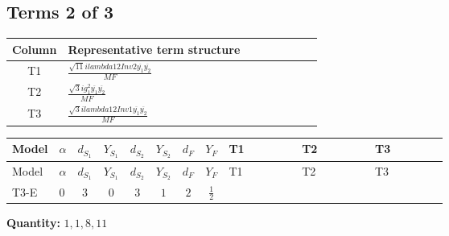\documentclass[8pt]{article}
\begin{document}
\begin{landscape}
\subsection*{Terms 2 of 3}
\begin{center}
\begin{tabular}{@{}c >{\raggedright\arraybackslash}p{0.82\linewidth}@{}}
\toprule
Column & Representative term structure \\
\midrule
T1 & \(\displaystyle \frac{\sqrt{11} i lambda12Inv2 \overline{y_{1}} \overline{y_{2}}}{MF}\) \\
\midrule
T2 & \(\displaystyle \frac{\sqrt{3} i g_{1}^{2} \overline{y_{1}} \overline{y_{2}}}{MF}\) \\
\midrule
T3 & \(\displaystyle \frac{\sqrt{3} i lambda12Inv1 \overline{y_{1}} \overline{y_{2}}}{MF}\) \\
\midrule
\bottomrule
\end{tabular}
\end{center}
\smallskip
\tiny
\begin{longtable}{@{}llcccccc >{\raggedright\arraybackslash}p{0.21\linewidth} >{\raggedright\arraybackslash}p{0.21\linewidth} >{\raggedright\arraybackslash}p{0.21\linewidth}@{}}
\toprule
Model & $\alpha$ & $d_{S_1}$ & $Y_{S_1}$ & $d_{S_2}$ & $Y_{S_2}$ & $d_F$ & $Y_F$ & T1 & T2 & T3 \\
\midrule
\endfirsthead
\toprule
Model & $\alpha$ & $d_{S_1}$ & $Y_{S_1}$ & $d_{S_2}$ & $Y_{S_2}$ & $d_F$ & $Y_F$ & T1 & T2 & T3 \\
\midrule
\endhead
T3-E & $0$ & $3$ & $0$ & $3$ & $1$ & $2$ & $\frac{1}{2}$ & \scriptsize\adjustbox{max width=\linewidth}{$\begin{gathered} - \frac{3 \sqrt{11} i lambda12Inv2 \overline{y_{1}} \overline{y_{2}}}{22 MF}\end{gathered}$} & \scriptsize\adjustbox{max width=\linewidth}{$\begin{gathered} - \frac{\sqrt{3} i g_{1}^{2} \overline{y_{1}} \overline{y_{2}}}{8 MF}\end{gathered}$} & \scriptsize\adjustbox{max width=\linewidth}{$\begin{gathered} \frac{\sqrt{3} i lambda12Inv1 \overline{y_{1}} \overline{y_{2}}}{6 MF}\end{gathered}$} \\
\midrule
\bottomrule
\end{longtable}
\clearpage
\noindent\textbf{Quantity: }$\mathrm{1,1,8,11}$\par\smallskip

\end{landscape}
\end{document}
